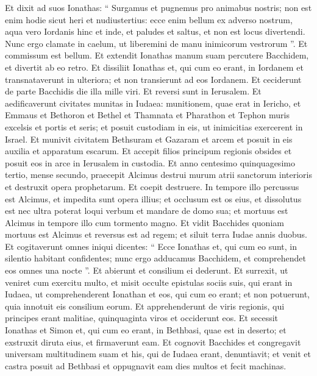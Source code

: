 \begin{biblechapter}
\begin{biblechapter}
\begin{biblechapter}
\begin{biblechapter}
\begin{biblechapter}
\begin{biblechapter}
\begin{biblechapter}
\begin{biblechapter}
\begin{biblechapter}
\verse Et dixit ad suos Ionathas: “ Surgamus et pugnemus pro animabus nostris; non est enim hodie sicut heri et nudiustertius: 
\verse ecce enim bellum ex adverso nostrum, aqua vero Iordanis hinc et inde, et paludes et saltus, et non est locus divertendi. 
\verse Nunc ergo clamate in caelum, ut liberemini de manu inimicorum vestrorum ”. Et commissum est bellum. 
\verse Et extendit Ionathas manum suam percutere Bacchidem, et divertit ab eo retro. 
 \verse Et dissiliit Ionathas et, qui cum eo erant, in Iordanem et transnataverunt in ulteriora; et non transierunt ad eos Iordanem. 
\verse Et ceciderunt de parte Bacchidis die illa mille viri. Et reversi sunt in Ierusalem. 
\verse Et aedificaverunt civitates munitas in Iudaea: munitionem, quae erat in Iericho, et Emmaus et Bethoron et Bethel et Thamnata et Pharathon et Tephon muris excelsis et portis et seris; 
\verse et posuit custodiam in eis, ut inimicitias exercerent in Israel. 
\verse Et munivit civitatem Bethsuram et Gazaram et arcem et posuit in eis auxilia et apparatum escarum. 
\verse Et accepit filios principum regionis obsides et posuit eos in arce in Ierusalem in custodia.
 \verse Et anno centesimo quinquagesimo tertio, mense secundo, praecepit Alcimus destrui murum atrii sanctorum interioris et destruxit opera prophetarum. Et coepit destruere. 
\verse In tempore illo percussus est Alcimus, et impedita sunt opera illius; et occlusum est os eius, et dissolutus est nec ultra poterat loqui verbum et mandare de domo sua; 
\verse et mortuus est Alcimus in tempore illo cum tormento magno. 
\verse Et vidit Bacchides quoniam mortuus est Alcimus et reversus est ad regem; et siluit terra Iudae annis duobus.
 \verse Et cogitaverunt omnes iniqui dicentes: “ Ecce Ionathas et, qui cum eo sunt, in silentio habitant confidentes; nunc ergo adducamus Bacchidem, et comprehendet eos omnes una nocte ”. 
\verse Et abierunt et consilium ei dederunt. 
\verse Et surrexit, ut veniret cum exercitu multo, et misit occulte epistulas sociis suis, qui erant in Iudaea, ut comprehenderent Ionathan et eos, qui cum eo erant; et non potuerunt, quia innotuit eis consilium eorum. 
\verse Et apprehenderunt de viris regionis, qui principes erant malitiae, quinquaginta viros et occiderunt eos. 
\verse Et secessit Ionathas et Simon et, qui cum eo erant, in Bethbasi, quae est in deserto; et exstruxit diruta eius, et firmaverunt eam. 
\verse Et cognovit Bacchides et congregavit universam multitudinem suam et his, qui de Iudaea erant, denuntiavit; 
\verse et venit et castra posuit ad Bethbasi et oppugnavit eam dies multos et fecit machinas. 

\end{biblechapter}
\end{biblechapter}
\end{biblechapter}
\end{biblechapter}
\end{biblechapter}
\end{biblechapter}
\end{biblechapter}
\end{biblechapter}
\end{biblechapter}
